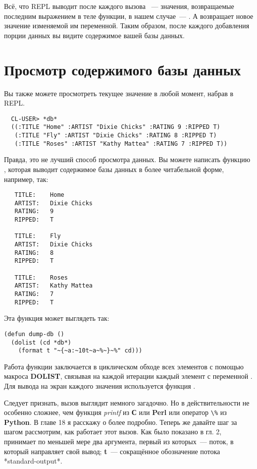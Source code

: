 Всё, что REPL выводит после каждого вызова ~--- значения, возвращаемые
последним выражением в теле функции, в нашем случае~--- . А 
возвращает новое значение изменяемой им переменной. Таким образом, после каждого
добавления порции данных вы видите содержимое вашей базы данных.

\section{Просмотр содержимого базы данных}

Вы также можете просмотреть текущее значение  в любой момент,
набрав  в REPL.

\begin{verbatim}
  CL-USER> *db*
  ((:TITLE "Home" :ARTIST "Dixie Chicks" :RATING 9 :RIPPED T)
   (:TITLE "Fly" :ARTIST "Dixie Chicks" :RATING 8 :RIPPED T)
   (:TITLE "Roses" :ARTIST "Kathy Mattea" :RATING 7 :RIPPED T))
\end{verbatim}

Правда, это не лучший способ просмотра данных. Вы можете написать функцию ,
которая выводит содержимое базы данных в более читабельной форме, например, так:

\begin{verbatim}
   TITLE:    Home
   ARTIST:   Dixie Chicks
   RATING:   9
   RIPPED:   T
   
   TITLE:    Fly
   ARTIST:   Dixie Chicks
   RATING:   8
   RIPPED:   T
   
   TITLE:    Roses
   ARTIST:   Kathy Mattea
   RATING:   7
   RIPPED:   T
\end{verbatim}

Эта функция может выглядеть так:

\begin{lstlisting}
(defun dump-db ()
  (dolist (cd *db*)
    (format t "~{~a:~10t~a~%~}~%" cd)))
\end{lstlisting}

Работа функции заключается в циклическом обходе всех элементов  с помощью макроса
\textbf{DOLIST}, связывая на каждой итерации каждый элемент с переменной . Для
вывода на экран каждого значения  используется функция .

Следует признать, вызов  выглядит немного загадочно. Но в действительности
 не особенно сложнее, чем функция \textit{printf} из \textbf{С} или
\textbf{Perl} или оператор \lstinline!\%! из \textbf{Python}. В главе 18 я расскажу о
 более подробно. Теперь же давайте шаг за шагом рассмотрим, как работает этот
вызов. Как было показано в гл. 2,  принимает по меньшей мере два аргумента,
первый из которых~--- поток, в который  направляет свой вывод; \textbf{t}~---
сокращённое обозначение потока *standard-output*.


